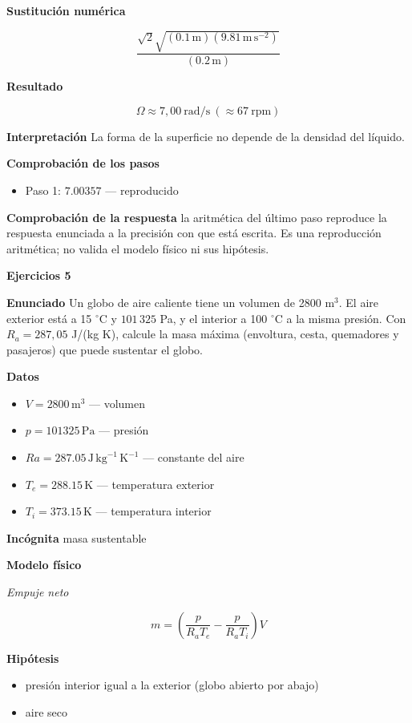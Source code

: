 \documentclass[10pt,openany]{book}
\begin{document}
\noindent\textbf{Sustitución numérica}

\[
\frac{\sqrt{2} \sqrt{\left(0.1\,\mathrm{m}\right) \left(9.81\,\mathrm{m}\,\mathrm{s}^{-2}\right)}}{\left(0.2\,\mathrm{m}\right)}
\]

\noindent\textbf{Resultado}

\[
\Omega \approx 7{,}00\ \mathrm{rad/s}\ (\approx 67\ \mathrm{rpm})
\]

\noindent\textbf{Interpretación}
La forma de la superficie no depende de la densidad del líquido.

\noindent\textbf{Comprobación de los pasos}
\begin{itemize}
\item Paso 1: $7.00357$ — reproducido
\end{itemize}

\noindent\textbf{Comprobación de la respuesta} la aritmética del último paso reproduce la respuesta enunciada a la precisión con que está escrita. Es una reproducción aritmética; no valida el modelo físico ni sus hipótesis.

\noindent\textbf{Ejercicios 5}

\noindent\textbf{Enunciado}
Un globo de aire caliente tiene un volumen de 2800 m\(^3\). El aire exterior está a 15 \(^\circ\)C y \(101\,325\) Pa, y el interior a 100 \(^\circ\)C a la misma presión. Con \(R_a = 287{,}05\) J/(kg K), calcule la masa máxima (envoltura, cesta, quemadores y pasajeros) que puede sustentar el globo.

\noindent\textbf{Datos}
\begin{itemize}
\item $V = 2800\,\mathrm{m}^{3}$ — volumen
\item $p = 101325\,\mathrm{Pa}$ — presión
\item $Ra = 287.05\,\mathrm{J}\,\mathrm{kg}^{-1}\,\mathrm{K}^{-1}$ — constante del aire
\item $T_{e} = 288.15\,\mathrm{K}$ — temperatura exterior
\item $T_{i} = 373.15\,\mathrm{K}$ — temperatura interior
\end{itemize}

\noindent\textbf{Incógnita}
masa sustentable

\noindent\textbf{Modelo físico}

\noindent\textit{Empuje neto}

\[
m = \left(\frac{p}{R_a T_e} - \frac{p}{R_a T_i}\right)V
\]

\noindent\textbf{Hipótesis}
\begin{itemize}
\item presión interior igual a la exterior (globo abierto por abajo)
\item aire seco
\end{itemize}
\end{document}
